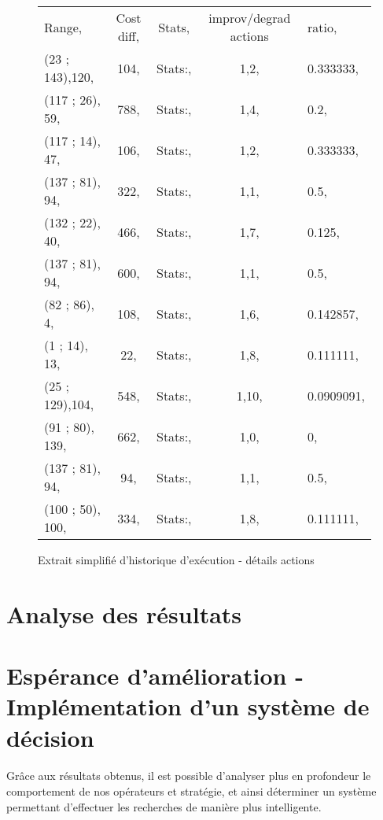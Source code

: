 \documentclass[a4paper,10pt]{report}
\begin{document}
\begin{figure}[h]
  \begin{tabular}{lcccl}
    Range,		&Cost diff,	&Stats,
						      &improv/degrad actions
									&ratio,\\
    (23  ; 143),120,	&104,		&Stats:,	&1,2,		&0.333333,\\
    (117 ; 26),  59,	&788,		&Stats:,	&1,4,		&0.2,\\
    (117 ; 14),  47,	&106,		&Stats:,	&1,2,		&0.333333,\\
    (137 ; 81),  94,	&322,		&Stats:,	&1,1,		&0.5,\\
    (132 ; 22),  40,	&466,		&Stats:,	&1,7,		&0.125,\\
    (137 ; 81),  94,	&600,		&Stats:,	&1,1,		&0.5,\\
    (82  ; 86),   4,	&108,		&Stats:,	&1,6,		&0.142857,\\
    (1   ; 14),  13,	&22,		&Stats:,	&1,8,		&0.111111,\\
    (25  ; 129),104,	&548,		&Stats:,	&1,10,		&0.0909091,\\
    (91  ; 80), 139,	&662,		&Stats:,	&1,0,		&0,\\
    (137 ; 81),  94,	&94,		&Stats:,	&1,1,		&0.5,\\
    (100 ; 50), 100,	&334,		&Stats:,	&1,8,		&0.111111,\\
  \end{tabular}
  \label{a280-sample-interval-simple-bis}
  \caption{Extrait simplifié d'historique d'exécution - détails actions}
\end{figure}


\pagebreak
\section{Analyse des résultats}


\section{Espérance d'amélioration - Implémentation d'un système de décision}

\paragraph{}
  Grâce aux résultats obtenus, il est possible d'analyser plus en profondeur le comportement de nos
opérateurs et stratégie, et ainsi déterminer un système permettant d'effectuer les recherches de
manière plus intelligente.
\end{document}
